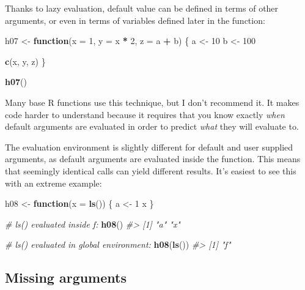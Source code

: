 \documentclass[]{book}
\newenvironment{Shaded}{\begin{snugshade}}{\end{snugshade}}
\newcommand{\CommentTok}[1]{\textcolor[rgb]{0.56,0.35,0.01}{\textit{#1}}}
\newcommand{\ControlFlowTok}[1]{\textcolor[rgb]{0.13,0.29,0.53}{\textbf{#1}}}
\newcommand{\DataTypeTok}[1]{\textcolor[rgb]{0.13,0.29,0.53}{#1}}
\newcommand{\DecValTok}[1]{\textcolor[rgb]{0.00,0.00,0.81}{#1}}
\newcommand{\KeywordTok}[1]{\textcolor[rgb]{0.13,0.29,0.53}{\textbf{#1}}}
\newcommand{\NormalTok}[1]{#1}
\newcommand{\OperatorTok}[1]{\textcolor[rgb]{0.81,0.36,0.00}{\textbf{#1}}}
\newcommand{\StringTok}[1]{\textcolor[rgb]{0.31,0.60,0.02}{#1}}
\theoremstyle{definition}
\theoremstyle{definition}
\theoremstyle{definition}
\theoremstyle{remark}
\begin{document}
Thanks to lazy evaluation, default value can be defined in terms of
other arguments, or even in terms of variables defined later in the
function:

\begin{Shaded}
\begin{Highlighting}[]
\NormalTok{h07 <-}\StringTok{ }\ControlFlowTok{function}\NormalTok{(}\DataTypeTok{x =} \DecValTok{1}\NormalTok{, }\DataTypeTok{y =}\NormalTok{ x }\OperatorTok{*}\StringTok{ }\DecValTok{2}\NormalTok{, }\DataTypeTok{z =}\NormalTok{ a }\OperatorTok{+}\StringTok{ }\NormalTok{b) \{}
\NormalTok{  a <-}\StringTok{ }\DecValTok{10}
\NormalTok{  b <-}\StringTok{ }\DecValTok{100}
  
  \KeywordTok{c}\NormalTok{(x, y, z)}
\NormalTok{\}}

\KeywordTok{h07}\NormalTok{()}
\end{Highlighting}
\end{Shaded}

Many base R functions use this technique, but I don't recommend it. It
makes code harder to understand because it requires that you know
exactly \emph{when} default arguments are evaluated in order to predict
\emph{what} they will evaluate to.

The evaluation environment is slightly different for default and user
supplied arguments, as default arguments are evaluated inside the
function. This means that seemingly identical calls can yield different
results. It's easiest to see this with an extreme example:

\begin{Shaded}
\begin{Highlighting}[]
\NormalTok{h08 <-}\StringTok{ }\ControlFlowTok{function}\NormalTok{(}\DataTypeTok{x =} \KeywordTok{ls}\NormalTok{()) \{}
\NormalTok{  a <-}\StringTok{ }\DecValTok{1}
\NormalTok{  x}
\NormalTok{\}}

\CommentTok{# ls() evaluated inside f:}
\KeywordTok{h08}\NormalTok{()}
\CommentTok{#> [1] "a" "x"}

\CommentTok{# ls() evaluated in global environment:}
\KeywordTok{h08}\NormalTok{(}\KeywordTok{ls}\NormalTok{())}
\CommentTok{#> [1] "f"}
\end{Highlighting}
\end{Shaded}

\hypertarget{missing-arguments}{%
\subsection{Missing arguments}\label{missing-arguments}}
\end{document}
